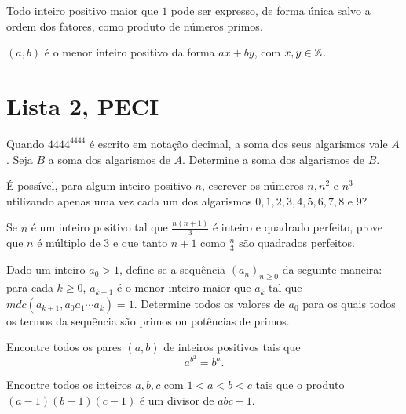 \documentclass[10pt,a4paper]{article}
\begin{document}
	\begin{thm}
		Todo inteiro positivo maior que $1$ pode ser expresso, de forma única salvo a ordem dos fatores, como produto de números primos.
	\end{thm}

	\begin{thm}
		$(a, b)$ é o menor inteiro positivo da forma $ax + by$, com $x, y \in \mathbb{Z}$.
	\end{thm}

	\newpage
	\section{Lista 2, PECI}

	\begin{prob}[IMO]
		Quando $4444^{4444}$ é escrito em notação decimal, a soma dos seus algarismos vale $A$. Seja $B$ a soma dos algarismos de $A$. Determine a soma dos algarismos de $B$.
	\end{prob}

	\begin{prob}
		É possível, para algum inteiro positivo $n$, escrever os números $n, n^2$ e $n^3$ utilizando apenas uma vez cada um dos algarismos $0,1,2,3,4,5,6,7,8$ e $9$?
	\end{prob}

	\begin{prob}[OBM 1989]
		Se $n$ é um inteiro positivo tal que $\frac{n(n+1)}3$ é inteiro e quadrado perfeito, prove que $n$ é múltiplo de $3$ e que tanto $n+1$ como $\frac n3$ são quadrados perfeitos.
	\end{prob}

	\begin{prob}[OBM 2001]
		Dado um inteiro $a_0>1$, define-se a sequência $(a_n)_{n\geq 0}$ da seguinte maneira: para cada $k\geq0$, $a_{k+1}$ é o menor inteiro maior que $a_k$ tal que $mdc(a_{k+1},a_0a_1\cdots a_k)=1$. Determine todos os valores de $a_0$ para os quais todos os termos da sequência são primos ou potências de primos.
	\end{prob}

	\begin{prob}[IMO 1997]
		Encontre todos os pares $(a,b)$ de inteiros positivos tais que $$a^{b^2}=b^a.$$
	\end{prob}

	\begin{prob}[IMO 1992]
		Encontre todos os inteiros $a,b,c$ com $1<a<b<c$ tais que o produto $(a-1)(b-1)(c-1)$ é um divisor de $abc-1$.
	\end{prob}
\end{document}
